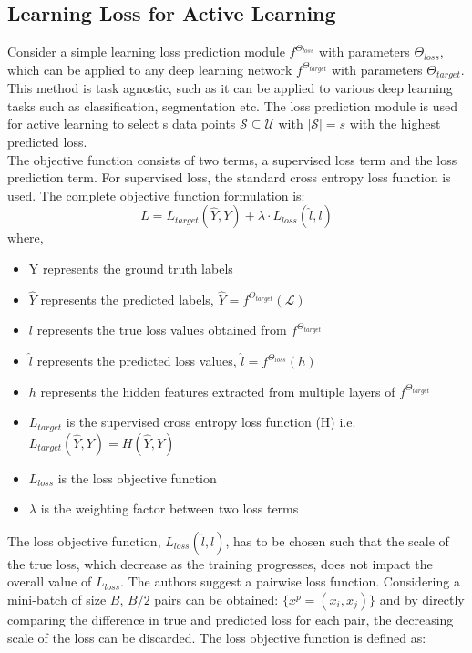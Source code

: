 \subsection{Learning Loss for Active Learning}
Consider a simple learning loss prediction module\cite{yoo2019} $f^{\Theta_{loss}}$ with parameters $\Theta_{loss}$, which can be applied to any deep learning network $f^{\Theta_{target}}$ with parameters $\Theta_{target}$. This method is task agnostic, such as it can be applied to various deep learning tasks such as classification, segmentation etc. The loss prediction module is used for active learning to select s data points $\mathcal{S} \subseteq \mathcal{U}$ with $|\mathcal{S}| = s$ with the highest predicted loss. \\
The objective function consists of two terms, a supervised loss term and the loss prediction term. For supervised loss, the standard cross entropy loss function\cite{cox1958} is used. The complete objective function formulation is:
\begin{equation}
    \label{equation:learning_loss_full_loss}
    L = L_{target}(\hat{Y}, Y) + \lambda \cdot L_{loss}(\hat{l}, l)
\end{equation}
where,
\begin{itemize}[label={}]
  \setlength\itemsep{0em}
  \item Y represents the ground truth labels
  \item $\hat{Y}$ represents the predicted labels, $\hat{Y} = f^{\Theta_{target}}(\mathcal{L})$
  \item $l$ represents the true loss values obtained from $f^{\Theta_{target}}$
  \item $\hat{l}$ represents the predicted loss values, $\hat{l} = f^{\Theta_{loss}}(h)$
  \item $h$ represents the hidden features extracted from multiple layers of $f^{\Theta_{target}}$
  \item $L_{target}$ is the supervised cross entropy loss function (H) i.e. $L_{target}(\hat{Y}, Y) = H(\hat{Y}, Y)$
  \item $L_{loss}$ is the loss objective function
  \item $\lambda$ is the weighting factor between two loss terms
\end{itemize}
The loss objective function, $L_{loss}(\hat{l}, l)$, has to be chosen such that the scale of the true loss, which decrease as the training progresses, does not impact the overall value of $L_{loss}$. The authors suggest a pairwise loss function. Considering a mini-batch of size $B$, $B/2$ pairs can be obtained: $\{x^p = (x_i, x_j)\}$ and by directly comparing the difference in true and predicted loss for each pair, the decreasing scale of the loss can be discarded. The loss objective function is defined as:
